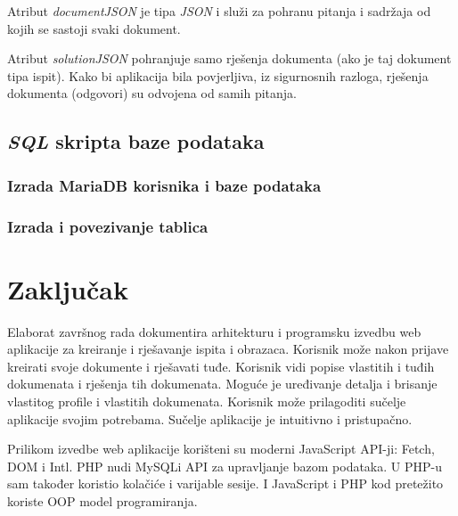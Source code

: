       Atribut \textit{documentJSON} je tipa \textit{JSON} i služi za pohranu
      pitanja i sadržaja od kojih se sastoji svaki dokument.

      Atribut \textit{solutionJSON} pohranjuje samo rješenja dokumenta (ako je
      taj dokument tipa ispit). Kako bi aplikacija bila povjerljiva, iz
      sigurnosnih razloga, rješenja dokumenta (odgovori) su odvojena od samih
      pitanja.

    \subsection{\textit{SQL} skripta baze podataka}

      \subsubsection{Izrada MariaDB korisnika i baze podataka}

        

      \subsubsection{Izrada i povezivanje tablica}

        




\section{Zaključak}

  Elaborat završnog rada dokumentira arhitekturu i programsku izvedbu web
  aplikacije za kreiranje i rješavanje ispita i obrazaca. Korisnik može nakon
  prijave kreirati svoje dokumente i rješavati tuđe. Korisnik vidi popise
  vlastitih i tuđih dokumenata i rješenja tih dokumenata. Moguće je uređivanje
  detalja i brisanje vlastitog profile i vlastitih dokumenata. Korisnik može
  prilagoditi sučelje aplikacije svojim potrebama. Sučelje aplikacije je
  intuitivno i pristupačno.

  Prilikom izvedbe web aplikacije korišteni su moderni JavaScript API-ji: Fetch,
  DOM i Intl. PHP nudi MySQLi API za upravljanje bazom podataka. U PHP-u sam
  također koristio kolačiće i varijable sesije. I JavaScript i PHP kod pretežito
  koriste OOP model programiranja.

